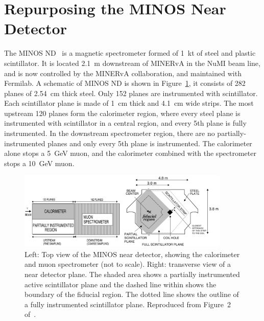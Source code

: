 \section{Repurposing the MINOS Near Detector}
\label{sec:MINOS}

The MINOS ND~\cite{MINOS_NIM} is a magnetic spectrometer formed of \SI{1}{\kilo\tonne} of steel and plastic scintillator. It is located \SI{2.1}{\metre} downstream of MINERvA in the NuMI beam line, and is now controlled by the MINERvA collaboration, and maintained with Fermilab. A schematic of MINOS ND is shown in Figure~\ref{fig:minos_near_detector}, it consists of 282 planes of \SI{2.54}{\centi\metre} thick steel. Only 152 planes are instrumented with scintillator. Each scintillator plane is made of \SI{1}{\centi\metre} thick  and \SI{4.1}{\centi\metre} wide strips. The most upstream 120 planes form the calorimeter region, where every steel plane is instrumented with scintillator in a central region, and every 5th plane is fully instrumented.  In the downstream spectrometer region, there are no partially-instrumented planes and only every 5th plane is instrumented. The calorimeter alone stops a 5~GeV muon, and the calorimeter combined with the spectrometer stops a 10~GeV muon.

\begin{figure}[htb]
	\centering
	\includegraphics[width=0.9\textwidth]{plots/minos.png}
	\caption{Left: Top view of the MINOS near detector, showing the calorimeter and muon spectrometer (not to scale). Right: transverse view of a near detector plane. The shaded area shows a partially instrumented active scintillator plane and the dashed line within shows the boundary of the fiducial region. The dotted line shows the outline of a fully instrumented scintillator plane. Reproduced from Figure~2 of~\cite{MINOSDetectors}.}
	\label{fig:minos_near_detector}
\end{figure}

